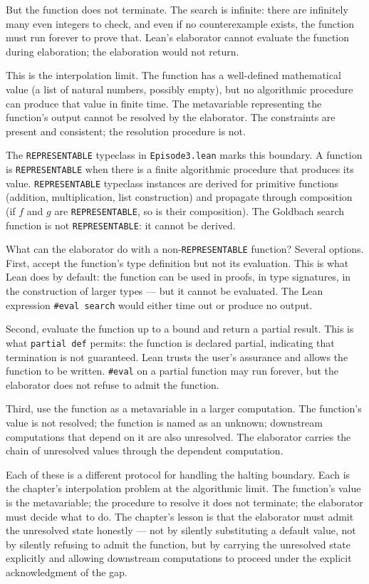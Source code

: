 But the function does not terminate. The search is infinite: there are
infinitely many even integers to check, and even if no counterexample
exists, the function must run forever to prove that. Lean's elaborator
cannot evaluate the function during elaboration; the elaboration would
not return.

This is the interpolation limit. The function has a well-defined
mathematical value (a list of natural numbers, possibly empty), but no
algorithmic procedure can produce that value in finite time. The
metavariable representing the function's output cannot be resolved by
the elaborator. The constraints are present and consistent; the
resolution procedure is not.

The \texttt{REPRESENTABLE} typeclass in \texttt{Episode3.lean} marks
this boundary. A function is \texttt{REPRESENTABLE} when there is a
finite algorithmic procedure that produces its value. \texttt{REPRESENTABLE}
typeclass instances are derived for primitive functions (addition,
multiplication, list construction) and propagate through composition
(if $f$ and $g$ are \texttt{REPRESENTABLE}, so is their composition).
The Goldbach search function is not \texttt{REPRESENTABLE}: it
cannot be derived.

What can the elaborator do with a non-\texttt{REPRESENTABLE} function?
Several options. First, accept the function's type definition but not
its evaluation. This is what Lean does by default: the function can be
used in proofs, in type signatures, in the construction of larger
types --- but it cannot be evaluated. The Lean expression
\texttt{\#eval search} would either time out or produce no output.

Second, evaluate the function up to a bound and return a partial
result. This is what \texttt{partial def} permits: the function is
declared partial, indicating that termination is not guaranteed.
Lean trusts the user's assurance and allows the function to be
written. \texttt{\#eval} on a partial function may run forever, but
the elaborator does not refuse to admit the function.

Third, use the function as a metavariable in a larger computation.
The function's value is not resolved; the function is named as an
unknown; downstream computations that depend on it are also
unresolved. The elaborator carries the chain of unresolved values
through the dependent computation.

Each of these is a different protocol for handling the halting
boundary. Each is the chapter's interpolation problem at the algorithmic
limit. The function's value is the metavariable; the procedure to
resolve it does not terminate; the elaborator must decide what to do.
The chapter's lesson is that the elaborator must admit the unresolved
state honestly --- not by silently substituting a default value, not by
silently refusing to admit the function, but by carrying the
unresolved state explicitly and allowing downstream computations to
proceed under the explicit acknowledgment of the gap.

